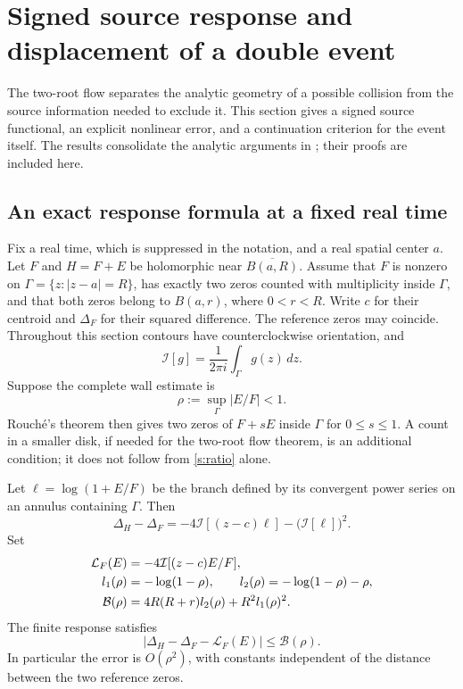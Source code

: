 \section{Signed source response and displacement of a double event}
\label{s:response}

The two-root flow separates the analytic geometry of a possible collision
from the source information needed to exclude it.  This section gives a
signed source functional, an explicit nonlinear error, and a continuation
criterion for the event itself.  The results consolidate the analytic
arguments in \cite{note08}; their proofs are included here.

\subsection{An exact response formula at a fixed real time}

Fix a real time, which is suppressed in the notation, and a real spatial
center $a$.  Let $F$ and $H=F+E$ be holomorphic near
$\overline{B(a,R)}$.  Assume that $F$ is nonzero on
$\Gamma=\{z:|z-a|=R\}$, has exactly two zeros counted with multiplicity
inside $\Gamma$, and that both zeros belong to $B(a,r)$, where $0<r<R$.
Write $c$ for their centroid and $\Delta_F$ for their squared difference.
The reference zeros may coincide.  Throughout this section contours have
counterclockwise orientation, and
\[
 \mathcal I[g]=\frac{1}{2\pi i}\int_\Gamma g(z)\,dz.
\]
Suppose the complete wall estimate is
\begin{equation}
 \rho:=\sup_\Gamma|E/F|<1.
 \label{s:ratio}
\end{equation}
Rouch\'e's theorem then gives two zeros of $F+sE$ inside $\Gamma$ for
$0\le s\le1$.  A count in a smaller disk, if needed for the two-root
flow theorem, is an additional condition; it does not follow from
\eqref{s:ratio} alone.

\begin{theorem}
\label{s:log-response}
Let $\ell=\log(1+E/F)$ be the branch defined by its convergent power
series on an annulus containing $\Gamma$.  Then
\begin{equation}
 \Delta_H-\Delta_F
 =-4\mathcal I[(z-c)\ell]-\bigl(\mathcal I[\ell]\bigr)^2.
 \label{s:exact-response}
\end{equation}
Set
\begin{align}
 \mathcal L_F(E)&=-4\mathcal I[(z-c)E/F],\label{s:linear-response}\\
 l_1(\rho)&=-\log(1-\rho),\qquad
 l_2(\rho)=-\log(1-\rho)-\rho,\notag\\
 \mathcal B(\rho)&=4R(R+r)l_2(\rho)+R^2l_1(\rho)^2.
 \label{s:quadratic-payment}
\end{align}
The finite response satisfies
\begin{equation}
 |\Delta_H-\Delta_F-\mathcal L_F(E)|\le\mathcal B(\rho).
 \label{s:response-bound}
\end{equation}
In particular the error is $O(\rho^2)$, with constants independent of
the distance between the two reference zeros.
\end{theorem}

